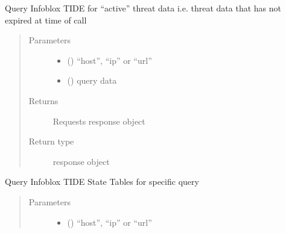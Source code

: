 \documentclass[letterpaper,10pt,english]{sphinxmanual}
\begin{document}
\begin{fulllineitems}
\begin{fulllineitems}
\end{fulllineitems}


\begin{fulllineitems}
\label{\detokenize{b1td-class:bloxone.b1td.querytideactive}}
\sphinxAtStartPar
Query Infoblox TIDE for “active” threat data
i.e. threat data that has not expired at time of call
\begin{quote}\begin{description}
\item[{Parameters}] \leavevmode\begin{itemize}
\item {} 
\sphinxAtStartPar
{} () \textendash{} “host”, “ip” or “url”

\item {} 
\sphinxAtStartPar
{} () \textendash{} query data

\end{itemize}

\item[{Returns}] \leavevmode
\sphinxAtStartPar
Requests response object

\item[{Return type}] \leavevmode
\sphinxAtStartPar
response object

\end{description}\end{quote}

\end{fulllineitems}


\begin{fulllineitems}
\label{\detokenize{b1td-class:bloxone.b1td.querytidestate}}
\sphinxAtStartPar
Query Infoblox TIDE State Tables for specific query
\begin{quote}\begin{description}
\item[{Parameters}] \leavevmode\begin{itemize}
\item {} 
\sphinxAtStartPar
{} () \textendash{} “host”, “ip” or “url”


\end{itemize}
\end{description}
\end{quote}
\end{fulllineitems}
\end{fulllineitems}
\end{document}
